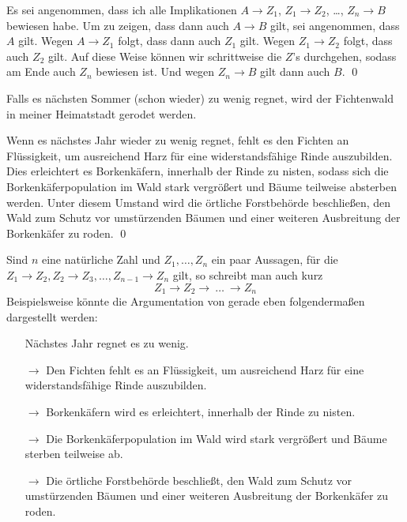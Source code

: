 \begin{bew}
    Es sei angenommen, dass ich alle Implikationen $A\to Z_1$, $Z_1\to Z_2$, \dots , $Z_n\to B$ bewiesen habe. Um zu zeigen, dass dann auch $A\to B$ gilt, sei angenommen, dass $A$ gilt. Wegen $A\to Z_1$ folgt, dass dann auch $Z_1$ gilt. Wegen $Z_1\to Z_2$ folgt, dass auch $Z_2$ gilt. Auf diese Weise können wir schrittweise die $Z$'s durchgehen, sodass am Ende auch $Z_n$ bewiesen ist. Und wegen $Z_n\to B$ gilt dann auch $B$. \qed
\end{bew}


\begin{bsp}
    Falls es nächsten Sommer (schon wieder) zu wenig regnet, wird der Fichtenwald in meiner Heimatstadt gerodet werden.
\end{bsp}


\begin{bew}
    Wenn es nächstes Jahr wieder zu wenig regnet, fehlt es den Fichten an Flüssigkeit, um ausreichend Harz für eine widerstandsfähige Rinde auszubilden. Dies erleichtert es Borkenkäfern, innerhalb der Rinde zu nisten, sodass sich die Borkenkäferpopulation im Wald stark vergrößert und Bäume teilweise absterben werden. Unter diesem Umstand wird die örtliche Forstbehörde beschließen, den Wald zum Schutz vor umstürzenden Bäumen und einer weiteren Ausbreitung der Borkenkäfer zu roden. \qed
\end{bew}

  
\begin{nota}[*]
    Sind $n$ eine natürliche Zahl und $Z_1,\dots , Z_n$ ein paar Aussagen, für die $Z_1\to Z_2, Z_2\to Z_3, \dots, Z_{n-1}\to Z_n$ gilt, so schreibt man auch kurz
        \[ Z_1\to Z_2\to\ \dots\ \to Z_n\]
    Beispielsweise könnte die Argumentation von gerade eben folgendermaßen dargestellt werden:
    \begin{itemize}
        \item[] Nächstes Jahr regnet es zu wenig.
        \item[$\to$] Den Fichten fehlt es an Flüssigkeit, um ausreichend Harz für eine widerstandsfähige Rinde auszubilden.
        \item[$\to$] Borkenkäfern wird es erleichtert, innerhalb der Rinde zu nisten.
        \item[$\to$] Die Borkenkäferpopulation im Wald wird stark vergrößert und Bäume sterben teilweise ab.
        \item[$\to$] Die örtliche Forstbehörde beschließt, den Wald zum Schutz vor umstürzenden Bäumen und einer weiteren Ausbreitung der Borkenkäfer zu roden.   
    \end{itemize}
\end{nota}





